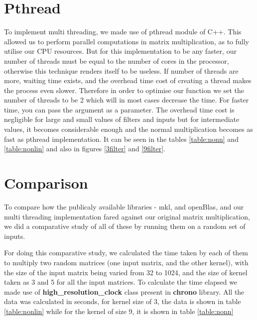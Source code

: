 \documentclass[a4paper]{article}
\begin{document}
\section{Pthread}
To implement multi threading, we made use of pthread module of C++. This allowed us to perform parallel computations in matrix multiplication, as to fully utilise our CPU resources. But for this implementation to be any faster, our number of threads must be equal to the number of cores in the processor, otherwise this technique renders itself to be useless. If number of threads are more, waiting time exists, and the overhead time cost of creating a thread makes the process even slower. Therefore in order to optimise our function we set the number of threads to be 2 which will in most cases decrease the time. For faster time, you can pass the argument as a parameter.
The overhead time cost is negligible for large and small values of filters and inputs but for intermediate values, it becomes considerable enough and the normal multiplication becomes as fast as pthread implementation. It can be seen in the tables \ref{table:nonn} and \ref{table:nonlin} and also in figures \ref{3filter} and \ref{9filter}.
 

\section{Comparison}
To compare how the publicaly available libraries - mkl, and openBlas, and our multi threading implementation fared against our original matrix multiplication, we did a comparative study of all of these by running them on a random set of inputs.

For doing this comparative study, we calculated the time taken by each of them to multiply two random matrices (one input matrix, and the other kernel), with the size of the input matrix being varied from 32 to 1024, and the size of kernel taken as 3 and 5 for all the input matrices. To calculate the time elapsed we made use of \textbf{high\_resolution\_clock} class present in \textbf{chrono} library. All the data was calculated in seconds, for kernel size of 3, the data is shown in table \ref{table:nonlin} while for the kernel of size 9, it is shown in table \ref{table:nonn}
\end{document}
